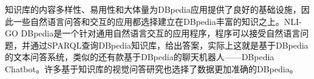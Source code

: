 知识库的内容多样性、易用性和大体量为DBpedia应用提供了良好的基础设施，因此一些自然语言问答和交互的应用都选择建立在DBpedia丰富的知识之上。NLI-GO DBpedia是一个针对通用自然语言交互的应用程序，程序可以接受自然语言问题，并通过SPARQL查询DBpedia知识库，给出答案，实际上这就是基于DBpedia的文本问答系统，类似的还有款基于DBpedia的聊天机器人——DBpedia Chatbot。许多基于知识库的视觉问答研究也选择了数据更加准确的DBpedia。

\begin{comment}
\textbf{OpenIE}
应用于构建知识库的信息提取技术（IR）往往需要人为构建大量手写规则，并选择合适的语料库，当已有的提取模型面对全新领域的语料库时，需要重新编写提取规则或者标注数据，这种系统在面对快速迭代和具有丰富多样性的互联网数据时，便会遇到自动化程度低、语料库异质性和效率问题。

为了节省信息提取过程的自动化程度，并能大范围应用于不同领域，Banko等人提出了一种能自主学习不同语料库的信息提取模型——开放信息提取技术（Open IE）\citing{banko2007open}。Open IE以语料库为输入，通过内部算法对语料库中的语句进行一次遍历，最终提取出语句中蕴含的（实体，关系，实体）三元组数据，在整个过程中不需要人工参与，因此可以应用于不同领域知识库的构建。

Banko等人还提出了一种应用高扩展性Open IE模型的系统TEXTRUNNER。TEXTRUNNER由自监督学习器、单通道提取器、基于冗余的评估器三个主要模块构成。自监督学习器以小的语料样本作为训练集，首先使用语句解析器从样本中粗略地提取出（实体，关系，实体）的三元组数据，再对提取出的内容进行标注，标注为“可信”和“不可信”两种标签，将带有标签的数据作为朴素贝叶斯分类器的训练样本。提取器遍历整个语料库，提取出所有可能的三元组数据。对于同一个句子，提取器能生成一个或多个三元组数据，这些数据将被送入学习器训练得到的分类器中，保留所有分在“可信”类别的数据。在得到所有提取出的知识后，评估器融合相同的数据，计算不同的数据的数量。基于以上统计，评估器对每一个三元组数据分配一个用于判断知识正确性的概率值，其中的假设是，如果从多个的语句中提取出相同的知识，那么该知识拥有较高的可信度。

在实验阶段，TEXTRUNNER从包含1.3亿个句子的900万个网页中提取出6000万个三元组数据，平均每个句子提取出2.2个关系数据。通过数据过滤、随机抽取、人工判定等方式，作者对提取数据的完整性和正确性进行了概率评估，过滤后的数据包含1130万个三元组数据，其中780万的数据被评估为“格式正确”且概率标签在0.8以上，80.4\%“格式正确”的数据通过人工评估被认定为正确的，从实体间的关系看，“格式正确”的数据中反映抽象事实的占86\%，其中77.2\%是正确的；反映具体事实的占14\%，其中88.1\%是正确的，如图所示\ref{textrunner}。
\begin{figure}[H]
	\centering
	\texttt{[image: textrunner.png]}
	\caption{TEXTRUNNER在实验环境下知识提取的正确率}
	\label{textrunner}
\end{figure}


\end{comment}
